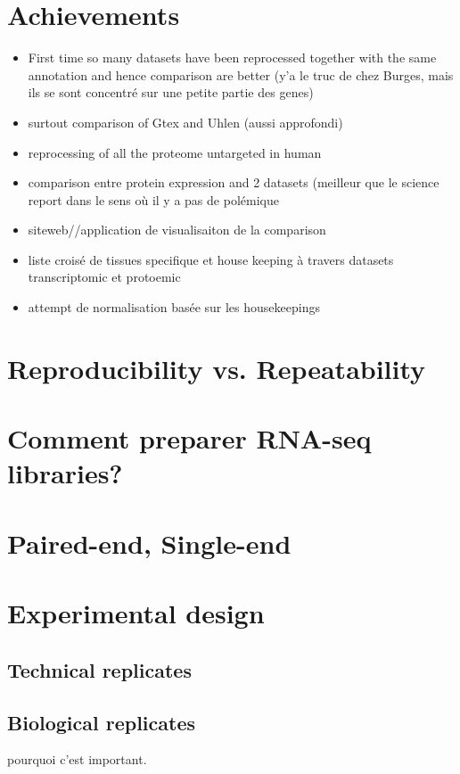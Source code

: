 \section{Achievements}
\begin{itemize}
    \item First time so many datasets have been reprocessed together with the
        same annotation and hence comparison are better (y'a le truc de chez Burges,
        mais ils se sont concentré sur une petite partie des genes)
    \item surtout comparison of Gtex and Uhlen (aussi approfondi)
    \item reprocessing of all the proteome untargeted in human
    \item comparison entre protein expression and 2 datasets (meilleur que le
        science report dans le sens où il y a pas de polémique
    \item siteweb//application de visualisaiton de la comparison
    \item liste croisé de tissues specifique et house keeping à travers datasets
        transcriptomic et protoemic
    \item attempt de normalisation basée sur les housekeepings
\end{itemize}


\section{Reproducibility vs. Repeatability}

\section{Comment preparer RNA-seq libraries?}

\section{Paired-end, Single-end}

\section{Experimental design}
\subsection{Technical replicates}
\subsection{Biological replicates}
pourquoi c'est important.
